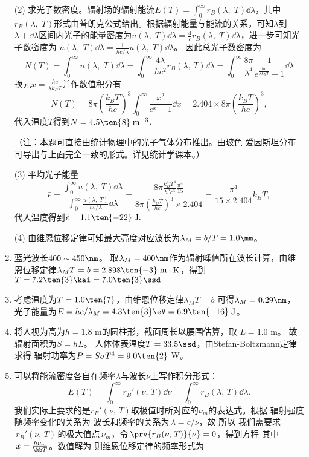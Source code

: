 \begin{enumerate}[label=1.\arabic*]
(2) 求光子数密度。辐射场的辐射能流$E(T)=\int_0^\infty r_B(\lambda,\;T )\dd{\lambda}$，其中$r_B(\lambda,\;T )$形式由普朗克公式给出。根据辐射能量与能流的关系，可知$\lambda$到$\lambda+\dd{\lambda}$区间内光子的能量密度为$u(\lambda,\;T)\dd{\lambda}= \frac 4c r_B(\lambda,\;T)\dd{\lambda}$，进一步可知光子数密度为
$n(\lambda,\;T)\dd{\lambda} = \frac{1}{hc/\lambda}u(\lambda,\;T)\dd{\lambda}$。
因此总光子数密度为
\[N(T)=\int_0^{\infty}n(\lambda,\;T)\dd{\lambda}=\int_0^{\infty}\frac{4\lambda}{hc^2}r_B(\lambda,\,T)\dd{\lambda} = \int_0^{\infty}\frac{8\pi}{\lambda^4}\frac{1}{e^{\frac{hc}{\lambda k_B T}}-1}\dd{\lambda}\]
换元$x=\frac{hc}{\lambda k_B T}$并作数值积分有
\[N(T)=8\pi \left(\frac{k_B T}{hc}\right)^3\int_0^\infty \frac{x^2}{e^x -1}\dd{x} = 2.404\times8\pi\left(\frac{k_B T}{hc}\right)^3,\]
代入温度$T$得到$N=4.5\ten{8}\;\mathrm{m^{-3}}$.

（注：本题可直接由统计物理中的光子气体分布推出。由玻色-爱因斯坦分布可导出与上面完全一致的形式。详见统计学课本。）

(3) 平均光子能量
\[\bar{\epsilon}=\frac{\int_0^{\infty}u(\lambda,\;T)\dd{\lambda}}{\int_0^{\infty}\frac{u(\lambda,\;T)}{hc/\lambda}\dd{\lambda}}=\frac{8\pi\frac{k_B^4 T^4}{h^3 c^3}\frac{\pi^4}{15}}{8\pi\left(\frac{k_B T}{hc}\right)^3\times 2.404} = \frac{\pi^4}{15\times2.404}k_B T,\]
代入温度得到$\bar\epsilon = 1.1\ten{-22}\;\mathrm{J}.$

(4) 由维恩位移定律可知最大亮度对应波长为$\lambda_M = b/T= 1.0\mm$。


\item
蓝光波长$400\sim 450 \nm$。
取$\lambda_M=400\nm$作为辐射峰值所在波长计算，由维恩位移定律$\lambda_M T=b=2.898\ten{-3}\;\mathrm{m\cdot K}$，得到$T=7.2\ten{3}\kai=7.0\ten{3}\ssd$

\item
考虑温度为$T = 1.0\ten{7}$，由维恩位移定律$\lambda_M T=b$
可得$\lambda_M = 0.29\nm$，
光子能量为$E=hc/\lambda_M=4.3\ten{3}\eV=6.9\ten{-16}\;\mathrm{J}$。

\item
将人视为高为$h=1.8$ m的圆柱形，截面周长以腰围估算，取
$L=1.0$ m。
故辐射面积为$S=hL$。
人体体表温度$T = 33.5\ssd$，由Stefan-Boltzmann定律求得
辐射功率为$P=S\sigma T^4= 9.0\ten{2}$ W。

\item
可以将能流密度各自在频率$\lambda$与波长$\nu$上写作积分形式：
\[E(T) = \int_0^{\infty}r_B'(\nu,\,T)\dd{\nu} = \int_0^{\infty}r_B(\lambda,\,T)\dd{\lambda}. \]
我们实际上要求的是$r_B'(\nu,\,T)$取极值时所对应的$\nu_m$的表达式。根据
辐射强度随频率变化的关系为
波长和频率的关系为$\,\lambda=c/\nu$，故
所以
我们需要求$\,r_B'(\nu,\,T)\,$的极大值点$\,\nu_m$，令$\,\prv{r_B(\nu,\,T)}{\nu}=0$，得到方程
其中$\,x=\frac{h\nu_m}{\kb T}$。数值解为
则维恩位移定律的频率形式为


\end{enumerate}
